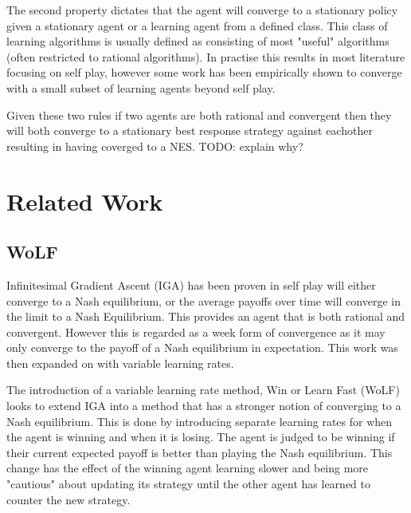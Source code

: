 \documentclass[conference]{IEEEtran}
\newcommand\TODO[1]{{\color{red}TODO: #1}}
\begin{document}
The second property dictates that the agent will converge to a stationary policy given a stationary agent or a learning agent from a defined class. This class of learning algorithms is usually defined as consisting of most "useful" algorithms (often restricted to rational algorithms). In practise this results in most literature focusing on self play, however some work has been empirically shown to converge with a small subset of learning agents beyond self play\cite{bowling2002multiagent}. 

Given these two rules if two agents are both rational and convergent then they will both converge to a stationary best response strategy against eachother resulting in having coverged to a NES. \TODO{explain why?}


\section{Related Work}

\subsection{WoLF}

Infinitesimal Gradient Ascent (IGA) has been proven in self play will either converge to a Nash equilibrium, or the average payoffs over time will converge in the limit to a Nash Equilibrium. This provides an agent that is both rational and convergent. However this is regarded as a week form of convergence as it may only converge to the payoff of a Nash equilibrium in expectation. This work was then expanded on with variable learning rates.

The introduction of a variable learning rate method, Win or Learn Fast (WoLF) looks to extend IGA into a method that has a stronger notion of converging to a Nash equilibrium. This is done by introducing separate learning rates for when the agent is winning and when it is losing. The agent is judged to be winning if their current expected payoff is better than playing the Nash equilibrium. This change has the effect of the winning agent learning slower and being more "cautious" about updating its strategy until the other agent has learned to counter the new strategy.
\end{document}
